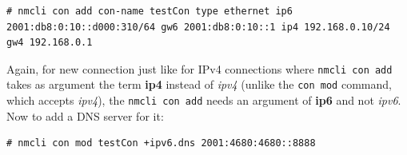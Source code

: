 \vspace{-15pt}
\begin{verbatim}
# nmcli con add con-name testCon type ethernet ip6 2001:db8:0:10::d000:310/64 gw6 2001:db8:0:10::1 ip4 192.168.0.10/24 gw4 192.168.0.1
\end{verbatim}
\vspace{-10pt}	

\noindent
Again, for new connection just like for IPv4 connections where \verb|nmcli con add| takes as argument the term \textbf{ip4} instead of \textit{ipv4} (unlike the \verb|con mod| command, which accepts \textit{ipv4}), the \verb|nmcli con add| needs an argument of \textbf{ip6} and not \textit{ipv6}. Now to add a DNS server for it:

\vspace{-15pt}
\begin{verbatim}
# nmcli con mod testCon +ipv6.dns 2001:4680:4680::8888
\end{verbatim}
\vspace{-10pt}